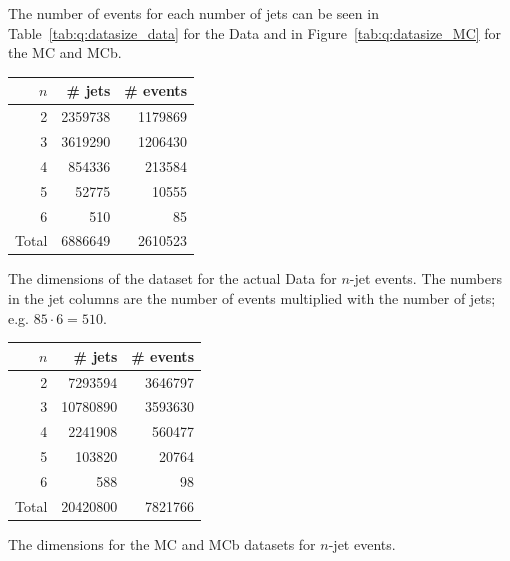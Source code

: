 The number of events for each number of jets can be seen in Table~\ref{tab:q:datasize_data} for the Data and in Figure~\ref{tab:q:datasize_MC} for the MC and MCb. 

\begin{margintable}[1cm]
  \centering
  \begin{tabular}{@{}rrr@{}}
  $n$ &      \# jets &    \# events \\
  \midrule
  \num{2}     &  \num{2359738} &  \num{1179869} \\
  \num{3}     &  \num{3619290} &  \num{1206430} \\
  \num{4}     &   \num{854336} &   \num{213584} \\
  \num{5}     &    \num{52775} &    \num{10555} \\
  \num{6}     &      \num{510} &       \num{85} \\
  Total       &  \num{6886649} &  \num{2610523} \\  
  \end{tabular}
  \vspace{\abovecaptionskip}
  \caption[Dimensions of dataset for Data]{The dimensions of the dataset for the actual Data for $n$-jet events. The numbers in the jet columns are the number of events multiplied with the number of jets; e.g. $85 \cdot 6 = 510$.}
  \label{tab:q:datasize_data}
  \vspace{\abovecaptionskip}
\end{margintable}

\begin{margintable}
  \centering
  \begin{tabular}{@{}rrr@{}}
  $n$ &      \# jets &    \# events \\
  \midrule
  \num{2}     &  \num{7293594} &  \num{3646797} \\
  \num{3}     &  \num{10780890} &  \num{3593630} \\
  \num{4}     &   \num{2241908} &   \num{560477} \\
  \num{5}     &    \num{103820} &    \num{20764} \\
  \num{6}     &      \num{588} &       \num{98} \\
  Total       &  \num{20420800} &  \num{7821766} \\  
  \end{tabular}
  \vspace{\abovecaptionskip}
  \caption[Dimensions of dataset for MC and MCb]{The dimensions for the MC and MCb datasets for $n$-jet events.}
  \label{tab:q:datasize_MC}
\end{margintable}

